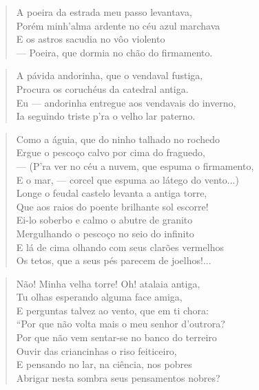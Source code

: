 \begin{anexosenv}
\begin{verse}
A poeira da estrada meu passo levantava, \\
Porém minh'alma ardente no céu azul marchava \\
E os astros sacudia no vôo violento \\
— Poeira, que dormia no chão do firmamento. \\
\end{verse}

\begin{verse}
A pávida andorinha, que o vendaval fustiga, \\
Procura os coruchéus da catedral antiga. \\
Eu — andorinha entregue aos vendavais do inverno, \\
Ia seguindo triste p'ra o velho lar paterno. \\
\end{verse}

\begin{verse}
Como a águia, que do ninho talhado no rochedo \\
Ergue o pescoço calvo por cima do fraguedo, \\
— (P'ra ver no céu a nuvem, que espuma o firmamento, \\
E o mar, — corcel que espuma ao látego do vento...) \\
Longe o feudal castelo levanta a antiga torre, \\
Que aos raios do poente brilhante sol escorre! \\
Ei-lo soberbo e calmo o abutre de granito \\
Mergulhando o pescoço no seio do infinito \\
E lá de cima olhando com seus clarões vermelhos \\
Os tetos, que a seus pés parecem de joelhos!... \\
\end{verse}

\begin{verse}
Não! Minha velha torre! Oh! atalaia antiga, \\
Tu olhas esperando alguma face amiga, \\
E perguntas talvez ao vento, que em ti chora: \\
``Por que não volta mais o meu senhor d'outrora? \\
Por que não vem sentar-se no banco do terreiro \\
Ouvir das criancinhas o riso feiticeiro, \\
E pensando no lar, na ciência, nos pobres \\
Abrigar nesta sombra seus pensamentos nobres? \\
\end{verse}


\end{anexosenv}

